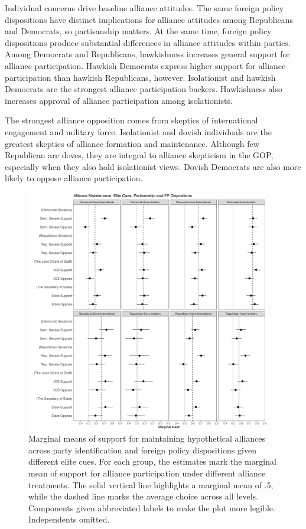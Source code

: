 \documentclass[12pt]{article}
\begin{document}
Individual concerns drive baseline alliance attitudes. 
The same foreign policy dispositions have distinct implications for alliance attitudes among Republicans and Democrats, so partisanship matters.
At the same time, foreign policy dispositions produce substantial differences in alliance attitudes within parties.  
Among Democrats and Republicans, hawkishness increases general support for alliance participation. 
Hawkish Democrats express higher support for alliance participation than hawkish Republicans, however. 
Isolationist and hawkish Democrats are the strongest alliance participation backers. 
Hawkishness also increases approval of alliance participation among isolationists. 


The strongest alliance opposition comes from skeptics of international engagement and military force. 
Isolationist and dovish individuals are the greatest skeptics of alliance formation and maintenance. 
Although few Republican are doves, they are integral to alliance skepticism in the GOP, especially when they also hold isolationist views.
Dovish Democrats are also more likely to oppose alliance participation.  


\begin{figure}
	\centering
		\includegraphics[width=0.95\textwidth]{../figures/party-dispo-main-el.png}
	\caption{Marginal means of support for maintaining hypothetical alliances across party identification and foreign policy dispositions given different elite cues. For each group, the estimates mark the marginal mean of support for alliance participation under different alliance treatments. The solid vertical line highlights a marginal mean of .5, while the dashed line marks the average choice across all levels. Components given abbreviated labels to make the plot more legible. Independents omitted.}
	\label{fig:party-dispo-main-el}
\end{figure}
\end{document}
